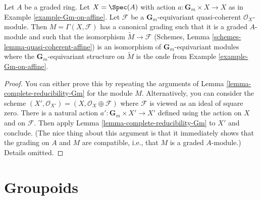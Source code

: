 \begin{lemma}
\label{lemma-Gm-equivariant-module}
Let $A$ be a graded ring. Let $X = \Spec(A)$ with action
$a : \mathbf{G}_m \times X \to X$ as in Example \ref{example-Gm-on-affine}.
Let $\mathcal{F}$ be a $\mathbf{G}_m$-equivariant quasi-coherent
$\mathcal{O}_X$-module. Then $M = \Gamma(X, \mathcal{F})$
has a canonical grading such that it is a graded $A$-module
and such that the isomorphism $\widetilde{M} \to \mathcal{F}$
(Schemes, Lemma \ref{schemes-lemma-quasi-coherent-affine})
is an isomorphism of $\mathbf{G}_m$-equivariant modules where
the $\mathbf{G}_m$-equivariant structure on $\widetilde{M}$
is the onde from Example \ref{example-Gm-on-affine}.
\end{lemma}

\begin{proof}
You can either prove this by repeating the arguments of
Lemma \ref{lemma-complete-reducibility-Gm} for the module $M$.
Alternatively, you can consider the scheme
$(X', \mathcal{O}_{X'}) = (X, \mathcal{O}_X \oplus \mathcal{F})$
where $\mathcal{F}$ is viewed as an ideal of square zero.
There is a natural action $a' : \mathbf{G}_m \times X' \to X'$
defined using the action on $X$ and on $\mathcal{F}$. Then apply
Lemma \ref{lemma-complete-reducibility-Gm} to $X'$ and conclude.
(The nice thing about this argument is that it immediately shows
that the grading on $A$ and $M$ are compatible, i.e., that $M$
is a graded $A$-module.)
Details omitted.
\end{proof}



\section{Groupoids}
\label{section-groupoids}

